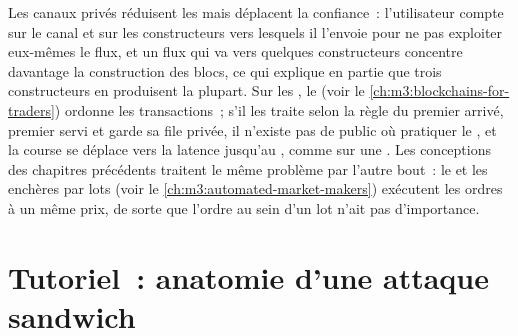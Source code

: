 Les canaux privés réduisent les  mais déplacent la confiance~: l'utilisateur compte sur le canal et sur les constructeurs vers lesquels il l'envoie pour ne pas exploiter eux-mêmes le flux,
et un flux qui va vers quelques constructeurs concentre davantage la construction des blocs, ce qui explique en partie que trois constructeurs en produisent la plupart. Sur les , le
 (voir le \cref{ch:m3:blockchains-for-traders}) ordonne les transactions~; s'il les traite selon la règle du premier arrivé, premier servi et garde sa file privée, il n'existe
pas de  public où pratiquer le , et la course se déplace vers la latence jusqu'au , comme sur une . Les conceptions des chapitres précédents traitent le
même problème par l'autre bout~: le  et les enchères par lots (voir le \cref{ch:m3:automated-market-makers}) exécutent les ordres à un même prix, de sorte que l'ordre
au sein d'un lot n'ait pas d'importance.

\section{Tutoriel~: anatomie d'une attaque sandwich}\label{tut:m3:maximal-extractable-value:sandwich}

